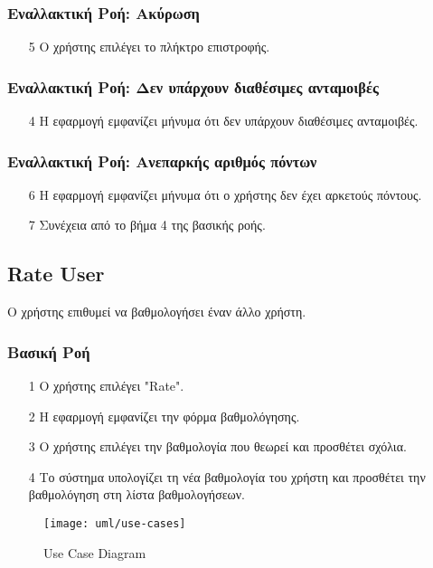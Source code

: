 \subsubsection{Εναλλακτική Ροή: Ακύρωση}

\begin{enumerate}
    \item[5] Ο χρήστης επιλέγει το πλήκτρο επιστροφής.
\end{enumerate}

\subsubsection{Εναλλακτική Ροή: Δεν υπάρχουν διαθέσιμες ανταμοιβές}

\begin{enumerate}
    \item[4] Η εφαρμογή εμφανίζει μήνυμα ότι δεν υπάρχουν διαθέσιμες ανταμοιβές.
\end{enumerate}

\subsubsection{Εναλλακτική Ροή: Ανεπαρκής αριθμός πόντων}

\begin{enumerate}
    \item[6] Η εφαρμογή εμφανίζει μήνυμα ότι ο χρήστης δεν έχει αρκετούς πόντους.
    \item[7] Συνέχεια από το βήμα 4 της βασικής ροής.
\end{enumerate}

\newpage

\subsection{Rate User}
\label{uc:rate-user}

Ο χρήστης επιθυμεί να βαθμολογήσει έναν άλλο χρήστη.

\subsubsection{Βασική Ροή}

\begin{enumerate}
    \item[1] Ο χρήστης επιλέγει "Rate".
    \item[2] Η εφαρμογή εμφανίζει την φόρμα βαθμολόγησης.
    \item[3] Ο χρήστης επιλέγει την βαθμολογία που θεωρεί και προσθέτει σχόλια.
    \item[4] Το σύστημα υπολογίζει τη νέα βαθμολογία του χρήστη και προσθέτει
        την βαθμολόγηση στη λίστα βαθμολογήσεων.
\end{enumerate}

\newpage

\begin{figure}
    \centering
    \texttt{[image: uml/use-cases]}
    \caption{Use Case Diagram}
\end{figure}


